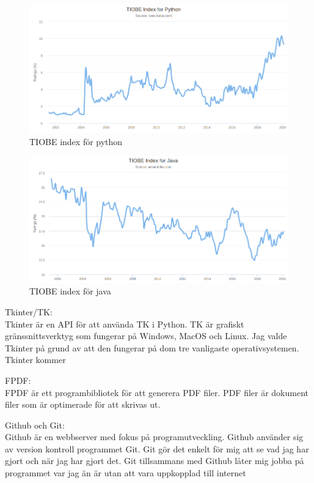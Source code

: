 \documentclass[a4paper, 12pt]{article}
\begin{document}
\begin{figure}[h!]
  \includegraphics[width=\linewidth]{img/TIOBE_python.png}
  \caption{TIOBE index för python}
  \label{fig:index_python}
\end{figure}
\begin{figure}[h!]
  \includegraphics[width=\linewidth]{img/TIOBE_java.png}
  \caption{TIOBE index för java}
  \label{fig:index_java}
\end{figure}


Tkinter/TK:\\
Tkinter är en API för att använda TK i Python. 
TK är grafiskt gränssnittsverktyg som fungerar på Windows, MacOS och Linux. 
Jag valde Tkinter på grund av att den fungerar på dom tre vanligaste operativsystemen.
Tkinter kommer 


FPDF:\\
FPDF är ett programbibliotek för att generera PDF filer.
PDF filer är dokument filer som är optimerade för att skrivas ut.


Github och Git:\\
Github är en webbserver med fokus på programutveckling. 
Github använder sig av version kontroll programmet Git. 
Git gör det enkelt för mig att se vad jag har gjort och när jag har gjort det.
Git tillsammans med Github låter mig jobba på programmet var jag än är utan att vara uppkopplad till internet
\end{document}
